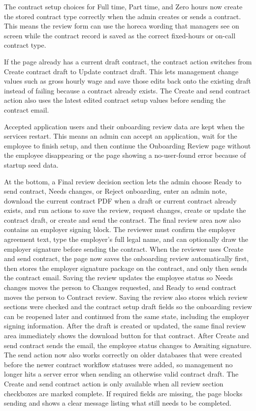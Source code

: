 \documentclass[11pt]{article}
\begin{document}
The contract setup choices for Full time, Part time, and Zero hours now create the stored contract type correctly when the admin creates or sends a contract. This means the review form can use the horeca wording that managers see on screen while the contract record is saved as the correct fixed-hours or on-call contract type.

If the page already has a current draft contract, the contract action switches from Create contract draft to Update contract draft. This lets management change values such as gross hourly wage and save those edits back onto the existing draft instead of failing because a contract already exists. The Create and send contract action also uses the latest edited contract setup values before sending the contract email.

Accepted application users and their onboarding review data are kept when the services restart. This means an admin can accept an application, wait for the employee to finish setup, and then continue the Onboarding Review page without the employee disappearing or the page showing a no-user-found error because of startup seed data.

At the bottom, a Final review decision section lets the admin choose Ready to send contract, Needs changes, or Reject onboarding, enter an admin note, download the current contract PDF when a draft or current contract already exists, and run actions to save the review, request changes, create or update the contract draft, or create and send the contract. The final review area now also contains an employer signing block. The reviewer must confirm the employer agreement text, type the employer's full legal name, and can optionally draw the employer signature before sending the contract. When the reviewer uses Create and send contract, the page now saves the onboarding review automatically first, then stores the employer signature package on the contract, and only then sends the contract email. Saving the review updates the employee status so Needs changes moves the person to Changes requested, and Ready to send contract moves the person to Contract review. Saving the review also stores which review sections were checked and the contract setup draft fields so the onboarding review can be reopened later and continued from the same state, including the employer signing information. After the draft is created or updated, the same final review area immediately shows the download button for that contract. After Create and send contract sends the email, the employee status changes to Awaiting signature. The send action now also works correctly on older databases that were created before the newer contract workflow statuses were added, so management no longer hits a server error when sending an otherwise valid contract draft. The Create and send contract action is only available when all review section checkboxes are marked complete. If required fields are missing, the page blocks sending and shows a clear message listing what still needs to be completed.
\end{document}
